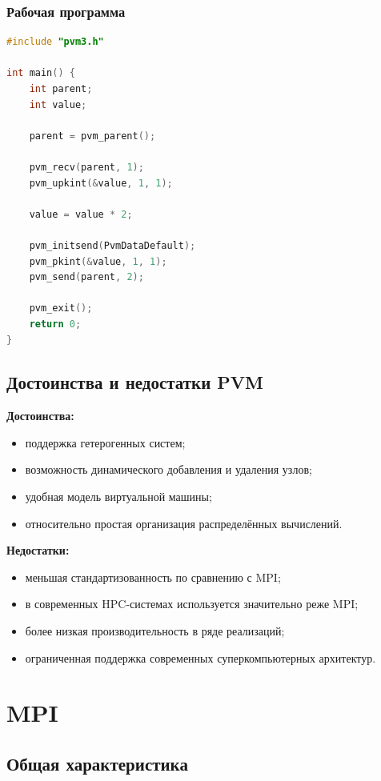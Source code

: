 \documentclass[12pt,a4paper]{article}
\begin{document}
\subsubsection{Рабочая программа}

\begin{lstlisting}[language=C]
#include "pvm3.h"

int main() {
    int parent;
    int value;

    parent = pvm_parent();

    pvm_recv(parent, 1);
    pvm_upkint(&value, 1, 1);

    value = value * 2;

    pvm_initsend(PvmDataDefault);
    pvm_pkint(&value, 1, 1);
    pvm_send(parent, 2);

    pvm_exit();
    return 0;
}
\end{lstlisting}

\subsection{Достоинства и недостатки PVM}

\textbf{Достоинства:}
\begin{itemize}
    \item поддержка гетерогенных систем;
    \item возможность динамического добавления и удаления узлов;
    \item удобная модель виртуальной машины;
    \item относительно простая организация распределённых вычислений.
\end{itemize}

\textbf{Недостатки:}
\begin{itemize}
    \item меньшая стандартизованность по сравнению с MPI;
    \item в современных HPC-системах используется значительно реже MPI;
    \item более низкая производительность в ряде реализаций;
    \item ограниченная поддержка современных суперкомпьютерных архитектур.
\end{itemize}

\section{MPI}

\subsection{Общая характеристика}
\end{document}
